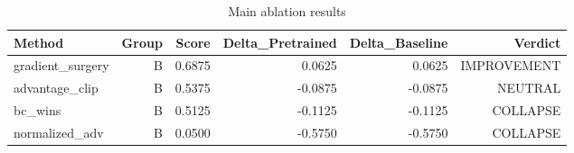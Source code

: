 \begin{table}[htbp]
\centering
\caption{Main ablation results}
\label{tab:main-results}
\begin{tabular}{lrrrrr}
\toprule
\textbf{Method} & \textbf{Group} & \textbf{Score} & \textbf{Delta\_Pretrained} & \textbf{Delta\_Baseline} & \textbf{Verdict} \\
\midrule
gradient\_surgery & B & 0.6875 & 0.0625 & 0.0625 & IMPROVEMENT \\
advantage\_clip & B & 0.5375 & -0.0875 & -0.0875 & NEUTRAL \\
bc\_wins & B & 0.5125 & -0.1125 & -0.1125 & COLLAPSE \\
normalized\_adv & B & 0.0500 & -0.5750 & -0.5750 & COLLAPSE \\
\bottomrule
\end{tabular}
\end{table}
